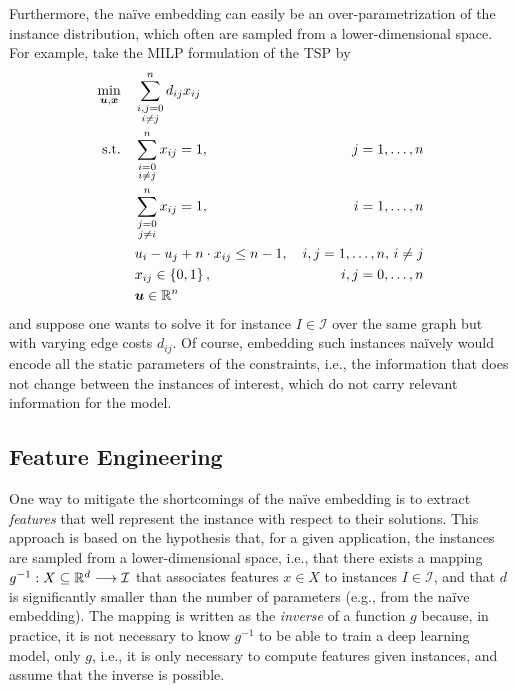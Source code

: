 Furthermore, the naïve embedding can easily be an over-parametrization of the instance distribution, which often are sampled from a lower-dimensional space.
For example, take the MILP formulation of the TSP by 
\begin{align*}
    \min_{\bm{u},\bm{x}} \quad & \sum_{\substack{i,j=0 \\ i\neq j}}^{n} d_{ij} x_{ij} & \\
    \textrm{s.t.} \quad & \sum_{\substack{i=0\\i\neq j}}^{n} x_{ij} = 1, &\, j=1,\ldots,n \\
			& \sum_{\substack{j=0\\j\neq i}}^{n} x_{ij} = 1, &\, i=1,\ldots,n \\
			& u_i - u_j + n \cdot x_{ij} \le n - 1, &\, i,j=1,\ldots,n,\, i\neq j\\
			& x_{ij} \in \left\{ 0,1 \right\}, &\, i,j=0,\ldots,n  \\
			& \bm{u} \in \mathbb{R}^{n} &
\end{align*}
and suppose one wants to solve it for instance $I\in \mathcal{I}$ over the same graph but with varying edge costs $d_{ij}$.
Of course, embedding such instances naïvely would encode all the static parameters of the constraints, i.e., the information that does not change between the instances of interest, which do not carry relevant information for the model.


\subsection{Feature Engineering}

One way to mitigate the shortcomings of the naïve embedding is to extract \emph{features} that well represent the instance with respect to their solutions.
This approach is based on the hypothesis that, for a given application, the instances are sampled from a lower-dimensional space, i.e., that there exists a mapping $g^{-1}: X\subseteq\mathbb{R}^{d} \longrightarrow \mathcal{I}$ that associates features $x\in X$ to instances $I\in \mathcal{I}$, and that $d$ is significantly smaller than the number of parameters (e.g., from the naïve embedding).
The mapping is written as the \emph{inverse} of a function $g$ because, in practice, it is not necessary to know $g^{-1}$ to be able to train a deep learning model, only $g$, i.e., it is only necessary to compute features given instances, and assume that the inverse is possible.

